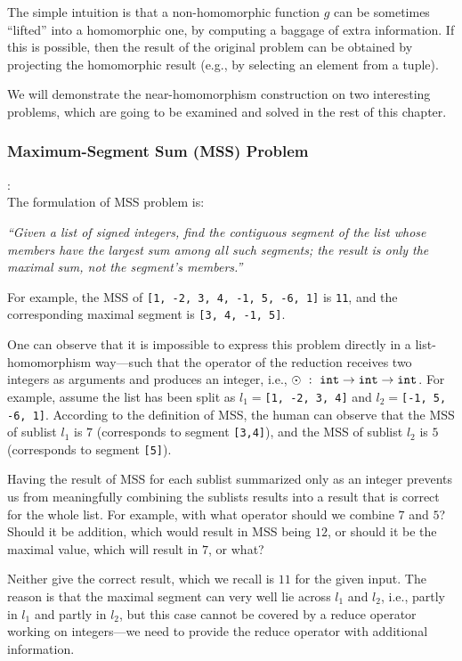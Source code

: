 \documentclass[acmsmall,review]{acmart}\settopmatter{printfolios=true,printccs=false,printacmref=false}
\begin{document}
The simple intuition is that a non-homomorphic function $g$ can 
be sometimes ``lifted'' into a homomorphic one, by computing
a baggage of extra information. If this is possible, then the
result of the original problem can be obtained by projecting
the homomorphic result (e.g., by selecting an element from a tuple).

We will demonstrate the near-homomorphism construction on two
interesting problems, which are going to be examined and solved
in the rest of this chapter.

\subsubsection{Maximum-Segment Sum (MSS) Problem}:
$\mbox{ }$\\

The formulation of MSS problem is:\bigskip

\emph{``Given a list of signed integers, find the contiguous segment 
  of the list whose members have the largest sum among all 
  such segments; the result is only the maximal sum, 
  not the segment's members.''}\bigskip

For example, the MSS of \lstinline{[1, -2, 3, 4, -1, 5, -6, 1]}
is \lstinline{11}, and the corresponding maximal segment is 
\lstinline{[3, 4, -1, 5]}.

One can observe that it is impossible to express this problem
directly in a list-homomorphism way---such that the operator 
of the reduction receives two integers as arguments and 
produces an integer, i.e., 
$\odot ~:~ \mbox{\tt int}\rightarrow\mbox{\tt int}\rightarrow\mbox{\tt int}$. 
For example, assume the list has been split as 
$l_1=$\lstinline{[1, -2, 3, 4]} and $l_2=$\lstinline{[-1, 5, -6, 1]}. 
According to the definition of MSS, the human can observe that 
the MSS of sublist $l_1$ is $7$ (corresponds to segment \lstinline{[3,4]}), 
and the MSS of sublist $l_2$ is $5$ (corresponds to segment \lstinline{[5]}).

Having the result of MSS for each sublist summarized only as an
integer prevents us from meaningfully combining the sublists results
into a result that is correct for the whole list. 
For example, with what operator should we combine $7$ and $5$?
Should it be addition, which would result in MSS being $12$,
or should it be the maximal value, which will result in $7$, or what?

Neither give the correct result, which we recall is $11$ for
the given input. 
The reason is that the maximal segment can very well lie across
$l_1$ and $l_2$, i.e., partly in $l_1$ and partly in $l_2$,
but this case cannot be covered by a reduce operator working on
integers---we need to provide the reduce operator with additional
information.
\end{document}
